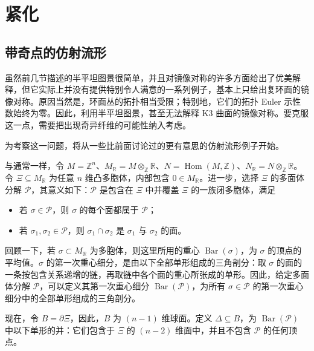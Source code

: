 \section{紧化}\label{sec:6.4}

\subsection{带奇点的仿射流形}\label{sec:6.4.1}

虽然前几节描述的半平坦图景很简单，并且对镜像对称的许多方面给出了优美解释，但它实际上并没有提供特别令人满意的一系列例子，基本上只给出复环面的镜像对称。原因当然是，环面丛的拓扑相当受限；特别地，它们的拓扑 Euler 示性数始终为零。因此，利用半平坦图景，甚至无法解释 K3 曲面的镜像对称。要克服这一点，需要把出现奇异纤维的可能性纳入考虑。

为考察这一问题，将从一些比前面讨论过的更有意思的仿射流形例子开始。

与通常一样，令 $M=\mathbb Z^n$、$M_{\mathbb R}=M\otimes_{\mathbb Z}\mathbb R$、$N=\operatorname{Hom}(M,\mathbb Z)$、$N_{\mathbb R}=N\otimes_{\mathbb Z}\mathbb R$。令 $\Xi\subseteq M_{\mathbb R}$ 为任意 $n$ 维凸多胞体，内部包含 $0\in M_{\mathbb R}$。进一步，选择 $\Xi$ 的多面体分解 $\mathcal P$，其意义如下：$\mathcal P$ 是包含在 $\Xi$ 中并覆盖 $\Xi$ 的一族闭多胞体，满足
\begin{itemize}
\item 若 $\sigma\in\mathcal P$，则 $\sigma$ 的每个面都属于 $\mathcal P$；
\item 若 $\sigma_1,\sigma_2\in\mathcal P$，则 $\sigma_1\cap\sigma_2$ 是 $\sigma_1$ 与 $\sigma_2$ 的面。
\end{itemize}

回顾一下，若 $\sigma\subset M_{\mathbb R}$ 为多胞体，则这里所用的重心 $\operatorname{Bar}(\sigma)$，为 $\sigma$ 的顶点的平均值。$\sigma$ 的第一次重心细分，是由以下全部单形组成的三角剖分：取 $\sigma$ 的面的一条按包含关系递增的链，再取链中各个面的重心所张成的单形。因此，给定多面体分解 $\mathcal P$，可以定义其第一次重心细分 $\operatorname{Bar}(\mathcal P)$，为所有 $\sigma\in\mathcal P$ 的第一次重心细分中的全部单形组成的三角剖分。

现在，令 $B=\partial\Xi$，因此，$B$ 为 $(n-1)$ 维球面。定义 $\Delta\subseteq B$，为 $\operatorname{Bar}(\mathcal P)$ 中以下单形的并：它们包含于 $\Xi$ 的 $(n-2)$ 维面中，并且不包含 $\mathcal P$ 的任何顶点。

